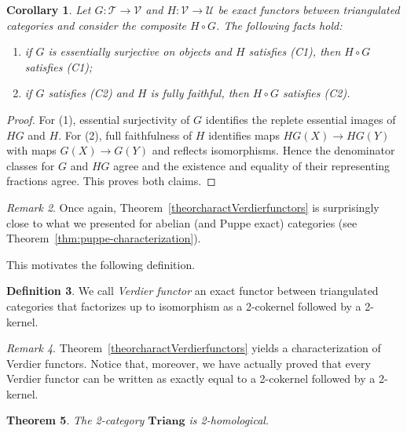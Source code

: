 \documentclass[11pt,reqno,a4paper]{amsart}
\newtheorem{theorem}{Theorem}[section]
\newtheorem{corollary}[theorem]{Corollary}
\theoremstyle{definition}
\newtheorem{definition}[theorem]{Definition}
\theoremstyle{remark}
\newtheorem{remark}[theorem]{Remark}
\def\nameit#1{\textrm{#1}~}
\def\thex{\nameit{Theorem}}
\def\dfn#1{{\itshape #1}}
\newcommand{\T}{\mathcal{T}}
\newcommand{\U}{\mathcal{U}}
\newcommand{\V}{\mathcal{V}}
\newcommand{\0}{\mathbf{0}}
\renewcommand{\1}{\mathbf{1}}
\newcommand{\Triang}{\mathbf{Triang}}
\def\:{\colon}
\def\c{\circ}
\begin{document}
\begin{corollary}
Let $G\:\T \to \V$ and $H\: \V \to \U$ be exact functors between triangulated categories and consider the composite $H\c G$. The following facts hold:
\begin{enumerate}
    \item if $G$ is essentially surjective on objects and $H$ satisfies (C1), then $H\c G$ satisfies (C1);
    \item if $G$ satisfies (C2) and $H$ is fully faithful, then $H\c G$ satisfies (C2).
\end{enumerate}
\end{corollary}
\begin{proof}
For (1), essential surjectivity of $G$ identifies the replete essential images of $HG$ and $H$. For (2), full faithfulness of $H$ identifies maps $HG(X)\to HG(Y)$ with maps $G(X)\to G(Y)$ and reflects isomorphisms. Hence the denominator classes for $G$ and $HG$ agree and the existence and equality of their representing fractions agree. This proves both claims.
\end{proof}

\begin{remark}
    Once again, \thex \ref{theorcharactVerdierfunctors} is surprisingly close to what we presented for abelian (and Puppe exact) categories (see \thex\ref{thm:puppe-characterization}).
\end{remark}

This motivates the following definition.

\begin{definition}
    We call \dfn{Verdier functor} an exact functor between triangulated categories that factorizes up to isomorphism as a 2-cokernel followed by a 2-kernel.
\end{definition}

\begin{remark}
    \thex\ref{theorcharactVerdierfunctors} yields a characterization of Verdier functors. Notice that, moreover, we have actually proved that every Verdier functor can be written as exactly equal to a 2-cokernel followed by a 2-kernel.
\end{remark}

\begin{theorem}\label{thm:tri-direct}
    The 2-category $\Triang$ is 2-homological.
\end{theorem}
\end{document}
